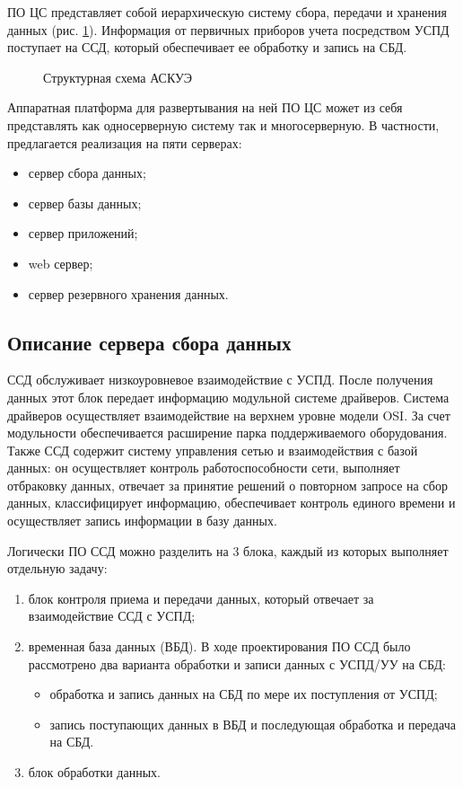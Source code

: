 ПО ЦС представляет собой иерархическую систему сбора, передачи и хранения данных (рис. \ref{irsh:irsh}). Информация от первичных приборов учета посредством УСПД поступает на ССД, который обеспечивает ее обработку и запись на СБД.

\begin{figure}[h!]
 \caption{Структурная схема АСКУЭ}
 \label{irsh:irsh}
\end{figure}

Аппаратная платформа для развертывания на ней ПО ЦС может из себя представлять как односерверную систему так и многосерверную. В частности, предлагается реализация на пяти серверах:

\begin{itemize}
 \item сервер сбора данных;
 \item сервер базы данных;
 \item сервер приложений;
 \item web сервер;
 \item сервер резервного хранения данных.
\end{itemize}


\subsection{Описание сервера сбора данных}

ССД обслуживает низкоуровневое взаимодействие с УСПД. После получения данных этот блок передает информацию модульной системе драйверов. Система драйверов осуществляет взаимодействие на верхнем уровне модели OSI. За счет модульности обеспечивается расширение парка поддерживаемого оборудования. Также ССД содержит систему управления сетью и взаимодействия с базой данных: он осуществляет контроль работоспособности сети, выполняет отбраковку данных, отвечает за принятие решений о повторном запросе на сбор данных, классифицирует информацию, обеспечивает контроль единого времени и осуществляет запись информации в базу данных.

Логически ПО ССД можно разделить на 3 блока, каждый из которых выполняет отдельную задачу:
\begin{enumerate}
\item блок контроля приема и передачи данных, который отвечает за взаимодействие ССД с УСПД;
\item временная база данных (ВБД). В ходе проектирования ПО ССД было рассмотрено два варианта обработки и записи данных с УСПД/УУ на СБД: 
\begin{itemize}
\item обработка и запись данных на СБД по мере их поступления от УСПД;
\item запись поступающих данных в ВБД и последующая обработка и передача на СБД.
\end{itemize}
\item блок обработки данных.
\end{enumerate}

